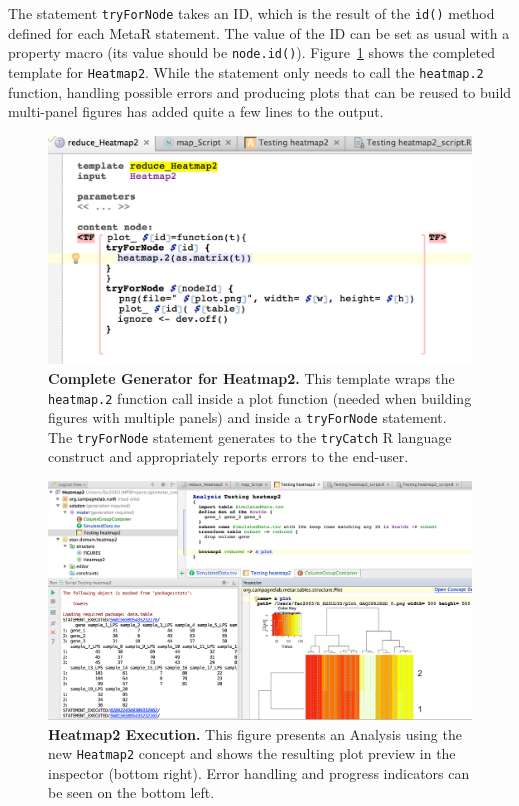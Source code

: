 The statement \texttt{tryForNode} takes an ID, which is the result of the \texttt{id()} method defined for each MetaR statement. The value of the ID can be set as usual with a property macro (its value should be \texttt{node.id()}). Figure~\ref{fig:Heatmap2GeneratorComplete} shows the completed template for \texttt{Heatmap2}. While the statement only needs to call the \texttt{heatmap.2} function, handling possible errors and producing plots that can be reused to build multi-panel figures has added quite a few lines to the output.

\begin{figure}[h!tbp]
  \centering
  \includegraphics[width=\figWidthWide]{figures/Heatmap2GeneratorComplete.png}
\caption[Complete Generator for Heatmap2.]{\textbf{Complete Generator for Heatmap2.} This template wraps the \texttt{heatmap.2} function call inside a plot function (needed when building figures with multiple panels) and inside a \texttt{tryForNode} statement. The \texttt{tryForNode} statement generates to the \texttt{tryCatch} R language construct and appropriately reports errors to the end-user.}
\label{fig:Heatmap2GeneratorComplete}
\end{figure}
 
\begin{figure}[h!tbp]
  \centering
  \includegraphics[width=\figWidthWide]{figures/Heatmap2_Execution.png}
\caption[Heatmap2 Execution.]{\textbf{Heatmap2 Execution.} This figure presents an Analysis using the new \texttt{Heatmap2} concept and shows the resulting plot preview in the inspector (bottom right). Error handling and progress indicators can be seen on the bottom left.}
\label{fig:Heatmap2_Execution}
\end{figure}
